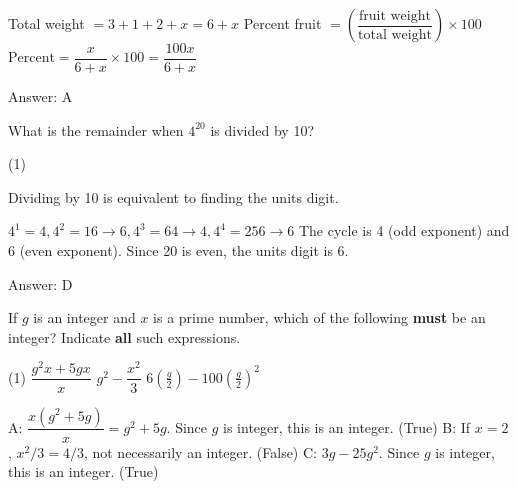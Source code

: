 \documentclass[11pt,paper=a4,answers]{exam}
\begin{document}
\begin{questions}
\begin{solution}
\begin{center}
Total weight $= 3 + 1 + 2 + x = 6 + x$
\vspace{5pt}
Percent fruit $= \left( \dfrac{\text{fruit weight}}{\text{total weight}} \right) \times 100$
\vspace{5pt}
$\text{Percent} = \dfrac{x}{6 + x} \times 100 = \dfrac{100x}{6 + x}$
\end{center}

Answer: \colorbox{yellow!100}{A}
\end{solution}

\vspace{1cm}

\question
What is the remainder when $4^{20}$ is divided by 10?

\begin{tasks}(1)
    
\end{tasks}

\begin{solution}
Dividing by 10 is equivalent to finding the units digit.
\vspace{5pt}
\begin{center}
$4^1 = 4, 4^2 = 16 \to 6, 4^3 = 64 \to 4, 4^4 = 256 \to 6$
\vspace{5pt}
The cycle is 4 (odd exponent) and 6 (even exponent).
\vspace{5pt}
Since 20 is even, the units digit is 6.
\end{center}

Answer: \colorbox{yellow!100}{D}
\end{solution}

\vspace{1cm}


\question
If $g$ is an integer and $x$ is a prime number, which of the following \textbf{must} be an integer?
Indicate \textbf{all} such expressions.

\begin{tasks}(1)
\task[A)] $\dfrac{g^2x + 5gx}{x}$
\task[B)] $g^2 - \dfrac{x^2}{3}$
\task[C)] $6(\frac{g}{2}) - 100(\frac{g}{2})^2$
\end{tasks}

\begin{solution}
\begin{center}
A: $\dfrac{x(g^2 + 5g)}{x} = g^2 + 5g$. Since $g$ is integer, this is an integer. (True)
\vspace{5pt}
B: If $x=2$, $x^2/3 = 4/3$, not necessarily an integer. (False)
\vspace{5pt}
C: $3g - 25g^2$. Since $g$ is integer, this is an integer. (True)
\end{center}


\end{solution}
\end{questions}
\end{document}
